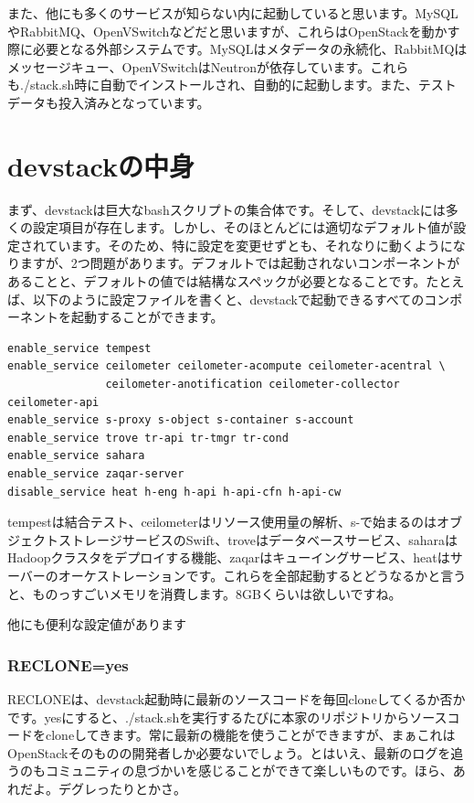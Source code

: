\documentclass[8pt,b5paper,tombo,openany]{jsbook}
\begin{document}
また、他にも多くのサービスが知らない内に起動していると思います。MySQLやRabbitMQ、OpenVSwitchなどだと思いますが、これらはOpenStackを動かす際に必要となる外部システムです。MySQLはメタデータの永続化、RabbitMQはメッセージキュー、OpenVSwitchはNeutronが依存しています。これらも./stack.sh時に自動でインストールされ、自動的に起動します。また、テストデータも投入済みとなっています。

\section{devstackの中身}

まず、devstackは巨大なbashスクリプトの集合体です。そして、devstackには多くの設定項目が存在します。しかし、そのほとんどには適切なデフォルト値が設定されています。そのため、特に設定を変更せずとも、それなりに動くようになりますが、2つ問題があります。デフォルトでは起動されないコンポーネントがあることと、デフォルトの値では結構なスペックが必要となることです。たとえば、以下のように設定ファイルを書くと、devstackで起動できるすべてのコンポーネントを起動することができます。

\begin{lstlisting}
enable_service tempest
enable_service ceilometer ceilometer-acompute ceilometer-acentral \
               ceilometer-anotification ceilometer-collector ceilometer-api
enable_service s-proxy s-object s-container s-account
enable_service trove tr-api tr-tmgr tr-cond
enable_service sahara
enable_service zaqar-server
disable_service heat h-eng h-api h-api-cfn h-api-cw
\end{lstlisting}

tempestは結合テスト、ceilometerはリソース使用量の解析、s-で始まるのはオブジェクトストレージサービスのSwift、troveはデータベースサービス、saharaはHadoopクラスタをデプロイする機能、zaqarはキューイングサービス、heatはサーバーのオーケストレーションです。これらを全部起動するとどうなるかと言うと、ものっすごいメモリを消費します。8GBくらいは欲しいですね。

他にも便利な設定値があります

\subsubsection{RECLONE=yes}

RECLONEは、devstack起動時に最新のソースコードを毎回cloneしてくるか否かです。yesにすると、./stack.shを実行するたびに本家のリポジトリからソースコードをcloneしてきます。常に最新の機能を使うことができますが、まぁこれはOpenStackそのものの開発者しか必要ないでしょう。とはいえ、最新のログを追うのもコミュニティの息づかいを感じることができて楽しいものです。ほら、あれだよ。デグレったりとかさ。
\end{document}
